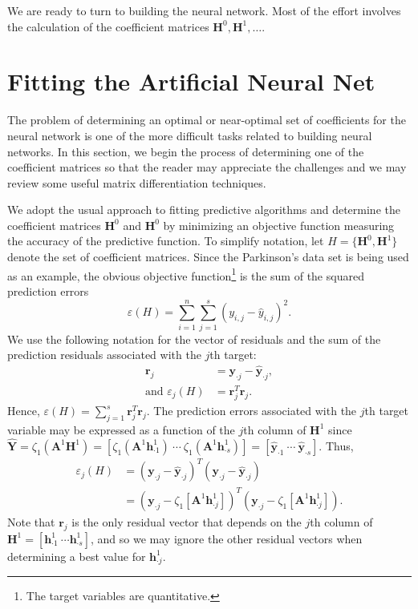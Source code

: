 \documentclass[graybox,envcountchap]{svmono}
\newcommand{\Yf}{\mathbf{Y}}
\newcommand{\hf}{\mathbf{h}}
\newcommand{\Hf}{\mathbf{H}}
\newcommand{\yf}{\mathbf{y}}
\newcommand{\nn}{neural network}
\newcommand{\w}{\widehat}
\begin{document}
We are ready to turn to building the {\nn }. Most of the effort involves the calculation of the coefficient matrices $\Hf^0,\Hf^1,\ldots$.

\section{Fitting the Artificial Neural Net}\label{section:fittingLinearNN}

The problem of determining an optimal or near-optimal set of coefficients for the {\nn } is one of the more difficult tasks related to building \nn s. In this section, we begin the process of determining one of the coefficient matrices so that the reader may appreciate the challenges and we may review some useful matrix differentiation techniques.

We adopt the usual approach to fitting predictive algorithms and determine the coefficient matrices $\Hf^0$ and $\Hf^0$  by minimizing an objective function measuring the accuracy of the predictive function.  To simplify notation, let $H = \{\Hf^0, \Hf^1\}$ denote the set of coefficient matrices. Since the Parkinson's data set is being used as an example, the obvious objective function\footnote{The target variables are quantitative.} is the sum of the squared prediction errors
\begin{equation}
 \varepsilon(H) =  \sum_{i=1}^n \sum_{j=1}^s (y_{i,j} - \w{y}_{i,j})^2.
\end{equation}
We use the following notation for the vector of residuals and the sum of the prediction residuals associated with the $j$th target:
\begin{equation}
\begin{align}
  \mathbf{r}_j &= \yf_{\cdot j} - \w{\yf}_{\cdot j}, \\
    \text{and } \varepsilon_j(H) &= \mathbf{r}_j^T\mathbf{r}_j.
\end{align}
\end{equation}
Hence, $\varepsilon(H) =   \sum_{j=1}^s\mathbf{r}_j^T\mathbf{r}_j$. The prediction errors associated with the $j$th target variable may be expressed as a function of the $j$th column of $\Hf^1$ since $\w{\Yf} = \zeta_1(\mathbf{A}^1\Hf^1) = [\zeta_1(\mathbf{A}^1\hf^1_{\cdot 1}) \ \cdots \ \zeta_1(\mathbf{A}^1\hf^1_{\cdot s})] = [\w{\yf}_{\cdot 1} \ \cdots \ \w{\yf}_{\cdot s}]$. Thus,
\begin{equation}
 \begin{align}
 \varepsilon_j(H) &=  (\yf_{\cdot j} - \w{\yf}_{\cdot j})^T(\yf_{\cdot j} - \w{\yf}_{\cdot j}) \\
&= (\yf_{\cdot j }  -\zeta_1[\mathbf{A}^1 \hf^1_{\cdot j }])^T(\yf_{\cdot j }  -\zeta_1[\mathbf{A}^1 \hf^1_{\cdot j }]).
 \end{align}
\end{equation}
Note that $\mathbf{r}_j$ is the only residual vector that depends on the $j$th column  of $\Hf^1 = [\hf^1_{\cdot 1} \ \cdots \hf^1_{\cdot s}]$, and so we may ignore the other residual vectors when determining a best value for $\hf^1_{\cdot j}$.
\end{document}
